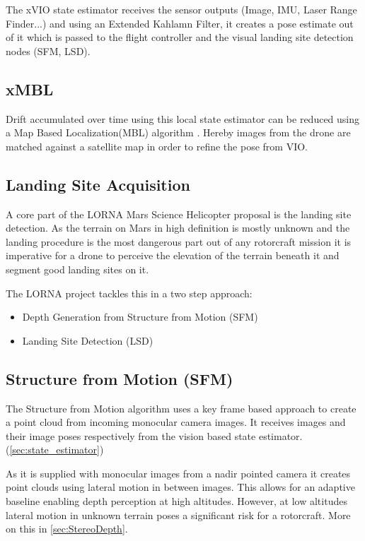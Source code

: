 The xVIO state estimator receives the sensor outputs (Image, IMU, Laser Range
Finder...) and using an Extended Kahlamn Filter, it creates a pose estimate out of it which is passed to the flight controller and the visual landing site detection nodes (SFM, LSD).

\subsection{xMBL}

Drift accumulated over time using this local state estimator can be reduced using a Map Based Localization(MBL) algorithm \citep{XMBL}. Hereby images from the drone are matched against a satellite map in order to refine the pose from VIO.


\subsection{Landing Site Acquisition }

A core part of the LORNA Mars Science Helicopter proposal is the landing site detection. As the terrain on Mars in high definition is mostly unknown and the landing procedure is the most dangerous part out of any rotorcraft mission it is imperative for a drone to perceive the elevation of the terrain beneath it and segment good landing sites on it.

The LORNA project tackles this in a two step approach:

\begin{itemize}
    \item Depth Generation from Structure from Motion (SFM) \citep{SFM}
    \item Landing Site Detection (LSD) \citep{LSD1, LSD2}
\end{itemize}

\subsection{Structure from Motion (SFM)}\label{subsec:related_work:SFM}

The Structure from Motion algorithm \citep{SFM} uses a key frame based approach to create a point cloud from incoming monocular camera images. It receives images and their image poses respectively from the vision based state estimator. (\ref{sec:state_estimator})

As it is supplied with monocular images from a nadir pointed camera it creates point clouds using lateral motion in between images. This allows for an adaptive baseline enabling depth perception at high altitudes. However, at low altitudes lateral motion in unknown terrain poses a significant risk for a rotorcraft. More on this in \cref{sec:StereoDepth}.


